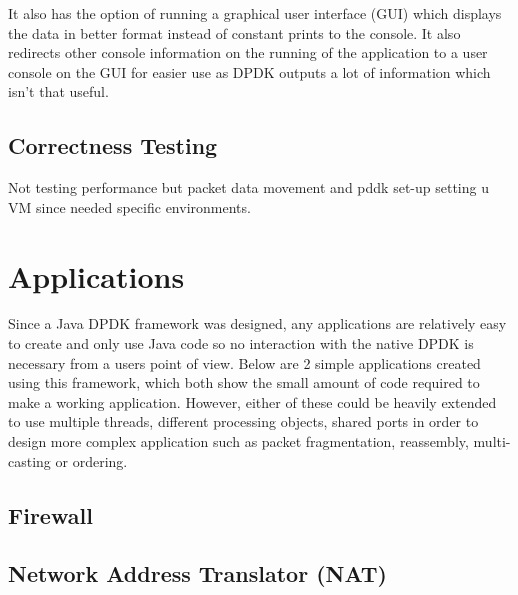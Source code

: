 \documentclass[final_report.tex]{subfiles}
\begin{document}
It also has the option of running a graphical user interface (GUI) which displays the data in better format instead of constant prints to the console. It also redirects other console information on the running of the application to a user console on the GUI for easier use as DPDK outputs a lot of information which isn't that useful.


\subsection{Correctness Testing}
Not testing performance but packet data movement and pddk set-up
setting u VM since needed specific environments.

\section{Applications}
Since a Java DPDK framework was designed, any applications are relatively easy to create and only use Java code so no interaction with the native DPDK is necessary from a users point of view. Below are 2 simple applications created using this framework, which both show the small amount of code required to make a working application. However, either of these could be heavily extended to use multiple threads, different processing objects, shared ports in order to design more complex application such as packet fragmentation, reassembly, multi-casting or ordering.

\subsection{Firewall}

\subsection{Network Address Translator (NAT)}
\end{document}
